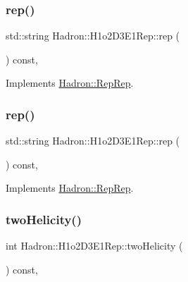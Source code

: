 \subsubsection{\texorpdfstring{rep()}{rep()}\hspace{0.1cm}{\footnotesize\ttfamily [4/5]}}
{\footnotesize\ttfamily std\+::string Hadron\+::\+H1o2\+D3\+E1\+Rep\+::rep (\begin{DoxyParamCaption}{ }\end{DoxyParamCaption}) const\hspace{0.3cm}{\ttfamily [inline]}, {\ttfamily [virtual]}}



Implements \mbox{\hyperlink{structHadron_1_1RepRep_ab3213025f6de249f7095892109575fde}{Hadron\+::\+Rep\+Rep}}.

\mbox{\label{structHadron_1_1H1o2D3E1Rep_a06bc9c58f069a4734422133269965d64}} 
\subsubsection{\texorpdfstring{rep()}{rep()}\hspace{0.1cm}{\footnotesize\ttfamily [5/5]}}
{\footnotesize\ttfamily std\+::string Hadron\+::\+H1o2\+D3\+E1\+Rep\+::rep (\begin{DoxyParamCaption}{ }\end{DoxyParamCaption}) const\hspace{0.3cm}{\ttfamily [inline]}, {\ttfamily [virtual]}}



Implements \mbox{\hyperlink{structHadron_1_1RepRep_ab3213025f6de249f7095892109575fde}{Hadron\+::\+Rep\+Rep}}.

\mbox{\label{structHadron_1_1H1o2D3E1Rep_ad799181c4402996e554f19711fdf3375}} 
\subsubsection{\texorpdfstring{twoHelicity()}{twoHelicity()}\hspace{0.1cm}{\footnotesize\ttfamily [1/3]}}
{\footnotesize\ttfamily int Hadron\+::\+H1o2\+D3\+E1\+Rep\+::two\+Helicity (\begin{DoxyParamCaption}{ }\end{DoxyParamCaption}) const\hspace{0.3cm}{\ttfamily [inline]}, {\ttfamily [virtual]}}

